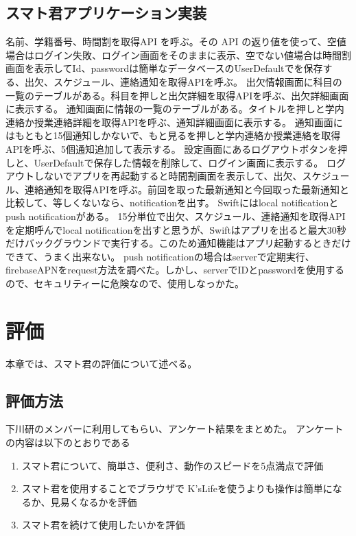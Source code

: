 \documentclass[a4j,12pt,onecolumn,oneside,titlepage,openany,final]{jreport}
\begin{document}
\section{スマト君アプリケーション実装}\label{rihabiri_jisso}
名前、学籍番号、時間割を取得API を呼ぶ。その API の返り値を使って、空値場合はログイン失敗、ログイン画面をそのままに表示、空でない値場合は時間割画面を表示してId、passwordは簡単なデータベースのUserDefaultでを保存する、出欠、スケジュール、連絡通知を取得APIを呼ぶ。
出欠情報画面に科目の一覧のテーブルがある。科目を押しと出欠詳細を取得APIを呼ぶ、出欠詳細画面に表示する。
通知画面に情報の一覧のテーブルがある。タイトルを押しと学内連絡か授業連絡詳細を取得APIを呼ぶ、通知詳細画面に表示する。
通知画面にはもともと15個通知しかないで、もと見るを押しと学内連絡か授業連絡を取得APIを呼ぶ、5個通知追加して表示する。
設定画面にあるログアウトボタンを押しと、UserDefaultで保存した情報を削除して、ログイン画面に表示する。
ログアウトしないでアプリを再起動すると時間割画面を表示して、出欠、スケジュール、連絡通知を取得APIを呼ぶ。前回を取った最新通知と今回取った最新通知と比較して、等しくないなら、notificationを出す。
Swiftにはlocal notificationとpush notificationがある。
15分単位で出欠、スケジュール、連絡通知を取得APIを定期呼んでlocal notificationを出すと思うが、Swiftはアプリを出ると最大30秒だけバックグラウンドで実行する。このため通知機能はアプリ起動するときだけできて、うまく出来ない。
push notificationの場合はserverで定期実行、firebaseAPNをrequest方法を調べた。しかし、serverでIDとpasswordを使用するので、セキュリティーに危険なので、使用しなっかた。


\chapter{評価}\label{hyoka}
本章では、スマト君の評価について述べる。

\section{評価方法}\label{rihabiri_jisso}
下川研のメンバーに利用してもらい、アンケート結果をまとめた。
アンケートの内容は以下のとおりである

\begin{enumerate}
  \item スマト君について、簡単さ、便利さ、動作のスピードを5点満点で評価
  \item スマト君を使用することでブラウザで K'sLifeを使うよりも操作は簡単になるか、見易くなるかを評価
  \item スマト君を続けて使用したいかを評価
\end{enumerate}
\end{document}
